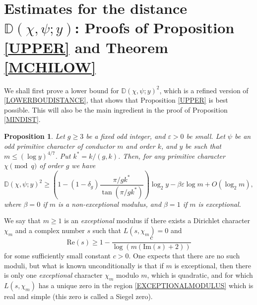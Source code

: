 \documentclass[12pt]{amsart}
\newtheorem{pro}[thm]{Proposition}
\theoremstyle{definition}
\numberwithin{equation}{section}
\newcommand{\mb}{\mathbb}
\begin{document}
\section{Estimates for the distance $\mb{D}(\chi,\psi;y)$: Proofs of Proposition \ref{UPPER} and Theorem \ref{MCHILOW}}
We shall first prove a lower bound for $\mb{D}(\chi,\psi;y)^2$, which is a refined version of \eqref{LOWERBOUDISTANCE}, that shows that Proposition  \ref{UPPER} is best possible. This will also be the main ingredient in the proof of Proposition \ref{MINDIST}. 

\begin{pro} \label{UPPER2}
Let $g\geq 3$ be a fixed odd integer, and $\varepsilon>0$ be small. Let $\psi$ be an odd primitive character of conductor $m$ and order $k$, and $y$ be such that $m\leq (\log y)^{4/7}$. Put $k^{\ast}=k/(g,k)$.  Then, for any primitive character $\chi \pmod q$ of order $g$ we have
$$
\mb{D}(\chi,\psi;y)^2\geq \left(1-(1-\delta_g)\frac{\pi/gk^{\ast}}{\tan(\pi/gk^{\ast})}\right) \log_2y-\beta \varepsilon \log m+ O\left(\log_2 m\right),
$$
where $\beta=0$ if $m$ is a non-exceptional modulus, and $\beta=1$ if $m$ is exceptional.
\end{pro}
We say that $m\geq 1$ is an {\it exceptional} modulus if there exists a Dirichlet character $\chi_m$ and a complex number $s$ such that  $L(s,\chi_m)=0$ and 
\begin{equation}\label{EXCEPTIONALMODULUS}
\text{Re}(s)\geq 1-\frac{c}{\log (m(\text{Im}(s)+2))}
\end{equation} 
for some sufficiently small constant $c>0$. 
One expects that there are no such moduli, but what is known unconditionally is that if $m$ is exceptional, then there is only one {\it exceptional} character $\chi_m$ modulo $m$, which is quadratic, and for which $L(s,\chi_m)$ has a unique zero in the region \eqref{EXCEPTIONALMODULUS} which is real and simple (this zero is called a Siegel zero).  
\end{document}

